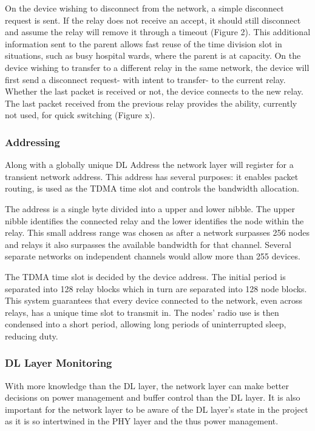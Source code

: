 On the device wishing to disconnect from the network, a simple disconnect request is sent. If the
relay does not receive an accept, it should still disconnect and assume the relay will remove it
through a timeout (Figure 2). This additional information sent to the parent allows fast reuse of the
time division slot in situations, such as busy hospital wards, where the parent is at capacity.
On the device wishing to transfer to a different relay in the same network, the device will first send a
disconnect request- with intent to transfer- to the current relay. Whether the last packet is received
or not, the device connects to the new relay. The last packet received from the previous relay
provides the ability, currently not used, for quick switching (Figure x). %

\subsubsection{Addressing}
Along with a globally unique \ac{DL} Address the network layer will register for a transient network
address. This address has several purposes: it enables packet routing, is used as the \ac{TDMA} time slot
and controls the bandwidth allocation.


The address is a single byte divided into a upper and lower nibble. The upper nibble identifies the
connected relay and the lower identifies the node within the relay. This small address range was
chosen as after a network surpasses 256 nodes and relays it also surpasses the available bandwidth
for that channel. Several separate networks on independent channels would allow more than 255
devices.


The \ac{TDMA} time slot is decided by the device address. The initial period is separated into 128 relay
blocks which in turn are separated into 128 node blocks. This system guarantees that every device
connected to the network, even across relays, has a unique time slot to transmit in. The nodes’ radio
use is then condensed into a short period, allowing long periods of uninterrupted sleep, reducing
duty.


\subsubsection{\acf{DL} Layer Monitoring}
With more knowledge than the \ac{DL} layer, the network layer can make better decisions on power
management and buffer control than the \ac{DL} layer. It is also important for the network layer to be
aware of the \ac{DL} layer’s state in the project as it is so intertwined in the \ac{PHY} layer and the thus power
management.

